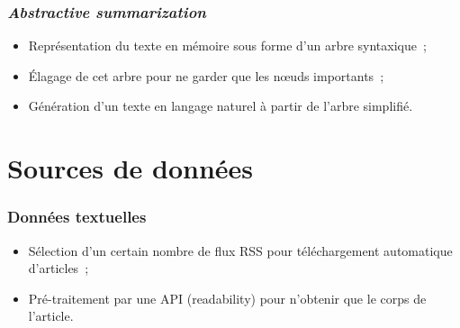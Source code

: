 \documentclass[12pt, handout]{beamer}
\begin{document}
\begin{frame}
 \frametitle{\textit{Abstractive summarization}}
 \begin{itemize}
  \item Représentation du texte en mémoire sous forme d'un arbre syntaxique~;
  \item Élagage de cet arbre pour ne garder que les nœuds importants~;
  \item Génération d'un texte en langage naturel à partir de l'arbre simplifié.
 \end{itemize}
\end{frame}


%  

\section{Sources de données}


\begin{frame}
 \frametitle{Données textuelles}
 \begin{itemize}
  \item Sélection d'un certain nombre de flux RSS pour téléchargement automatique d'articles~;
  \item Pré-traitement par une API (readability) pour n'obtenir que le corps de l'article.
 \end{itemize}
 
 
\end{frame}

\end{document}
